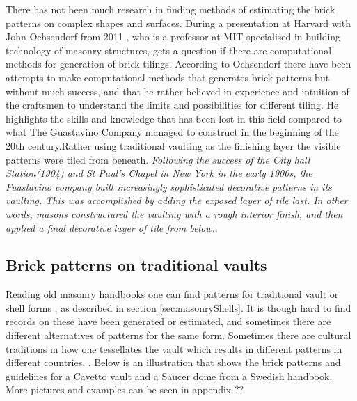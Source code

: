 There has not been much research in finding methods of estimating the brick patterns on complex shapes and surfaces. During a presentation at Harvard with John Ochsendorf from 2011 \cite{ref:interview}, who is a professor at MIT specialised in building technology of masonry structures, gets a question if there are computational methods for generation of brick tilings. According to Ochsendorf there have been attempts to make computational methods that generates brick patterns but without much success, and that he rather believed in experience and intuition of the craftsmen to understand the limits and possibilities for different tiling. He highlights the skills and knowledge that has been lost in this field compared to what The Guastavino Company managed to construct in the beginning of the 20th century.Rather using traditional vaulting as the finishing layer the visible patterns were tiled from beneath. \textit{Following the success of the City hall Station(1904) and St Paul's Chapel in New York in the early 1900s, the Fuastavino company built increasingly sophisticated decorative patterns in its vaulting. This was accomplished by adding the exposed layer of tile last. In other words, masons constructured the vaulting with a rough interior finish, and then applied a final decorative  layer of tile from below.}\cite{ref:Ochsendorf}.






\subsection{Brick patterns on traditional vaults}

Reading old masonry handbooks \cite{ref:murning} one can find patterns for traditional vault or shell forms , as described in section \ref{sec:masonryShells}. It is though hard to find records on these have been generated or estimated, and sometimes there are different alternatives of patterns for the same form. Sometimes there are cultural traditions in how one tessellates the vault which results in different patterns in different countries. \cite{ref:Heyman}.  Below is an illustration that shows the brick patterns and guidelines for a Cavetto vault and a Saucer dome from a Swedish handbook.  More pictures and examples can be seen in appendix ??

